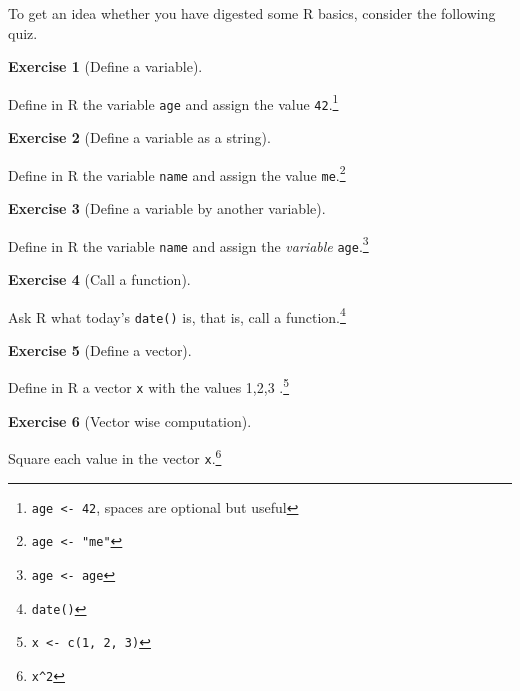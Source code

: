 \documentclass[
  letterpaper,
  DIV=11,
  numbers=noendperiod]{scrreprt}
\theoremstyle{definition}
\newtheorem{exercise}{Exercise}[chapter]
\theoremstyle{definition}
\theoremstyle{remark}
\begin{document}
To get an idea whether you have digested some R basics, consider the
following quiz.

\leavevmode{}%
\begin{exercise}[Define a variable]\label{exr-q1}

Define in R the variable \texttt{age} and assign the value
\texttt{42}.\footnote{\texttt{age\ \textless{}-\ 42}, spaces are
  optional but useful}

\end{exercise}

\leavevmode{}%
\begin{exercise}[Define a variable as a string]\label{exr-q2}

Define in R the variable \texttt{name} and assign the value
\texttt{me}.\footnote{\texttt{age\ \textless{}-\ "me"}}

\end{exercise}

\leavevmode{}%
\begin{exercise}[Define a variable by another variable]\label{exr-q3}

Define in R the variable \texttt{name} and assign the \emph{variable}
\texttt{age}.\footnote{\texttt{age\ \textless{}-\ age}}

\end{exercise}

\leavevmode{}%
\begin{exercise}[Call a function]\label{exr-q3a}

Ask R what today's \texttt{date()} is, that is, call a
function.\footnote{\texttt{date()}}

\end{exercise}

\leavevmode{}%
\begin{exercise}[Define a vector]\label{exr-q4}

Define in R a vector \texttt{x} with the values 1,2,3 .\footnote{\texttt{x\ \textless{}-\ c(1,\ 2,\ 3)}}

\end{exercise}

\leavevmode{}%
\begin{exercise}[Vector wise computation]\label{exr-q5}

Square each value in the vector \texttt{x}.\footnote{\texttt{x\^{}2}}

\end{exercise}
\end{document}
